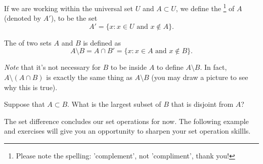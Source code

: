 If we are working within the universal set $U$ and $A \subset U$, we define the \footnote{Please note the spelling: 'complement', not 'compliment', thank you!} of $A$ (denoted by $A'$), to be the set
\[
A' = \{ x : x \in U \text{ and } x \notin A \}.
\]


\begin{defn}\label{setdifference}
The  of two sets $A$ and $B$ is defined as
\[
A \setminus B = A \cap B'  = \{ x : x \in A \text{ and } x \notin B \}.
\]
\end{defn}
\emph{Note} that it's not necessary for $B$ to be inside $A$ to define $A \setminus B$. In fact, $A \setminus (A \cap B)$ is exactly the same thing as $A \setminus B$ (you may draw a picture to see why this is true).

\begin{exercise}{18}
Suppose that $A \subset B$. What is the largest subset of $B$ that is disjoint from $A$?
\end{exercise}

\noindent
The set difference concludes our set operations for now.  The following example and exercises will give you an opportunity to sharpen your set operation skillls. 
 
